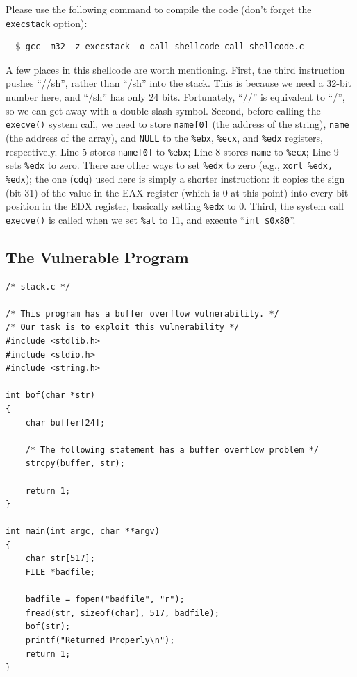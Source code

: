 Please use the following command to compile the code (don't forget the 
{\tt execstack} option):

\begin{verbatim}
  $ gcc -m32 -z execstack -o call_shellcode call_shellcode.c
\end{verbatim}


A few places in this shellcode are worth mentioning. First, 
the third instruction pushes ``//sh'', rather than ``/sh'' into the 
stack. This is because we need a 32-bit number here, and ``/sh'' 
has only 24 bits. Fortunately, ``//'' is equivalent to ``/'', so we can get 
away with a double slash symbol. Second, before calling the {\tt execve()}
system call, we need to store {\tt name[0]} (the address of the string), 
{\tt name} (the address of the array), and {\tt NULL} to
the {\tt \%ebx}, {\tt \%ecx}, and {\tt \%edx} registers, respectively. 
Line 5 stores {\tt name[0]} to {\tt \%ebx}; 
Line 8 stores {\tt name} to    {\tt \%ecx}; 
Line 9 sets {\tt \%edx} to zero. There are other ways to set {\tt \%edx}
to zero (e.g., {\tt xorl \%edx, \%edx}); the one ({\tt cdq}) used here
is simply a shorter instruction: it copies the sign (bit 31) of the value in the EAX
register (which is 0 at this point) into every bit position in the EDX
register, basically setting {\tt \%edx} to 0.
Third, the system call {\tt execve()} is called when we set {\tt \%al} to
11, and execute ``{\tt int \$0x80}''.

\subsection{The Vulnerable Program}

\begin{verbatim}
/* stack.c */

/* This program has a buffer overflow vulnerability. */
/* Our task is to exploit this vulnerability */
#include <stdlib.h>
#include <stdio.h>
#include <string.h>

int bof(char *str)
{
    char buffer[24];

    /* The following statement has a buffer overflow problem */ 
    strcpy(buffer, str);

    return 1;
}

int main(int argc, char **argv)
{
    char str[517];
    FILE *badfile;

    badfile = fopen("badfile", "r");
    fread(str, sizeof(char), 517, badfile);
    bof(str);
    printf("Returned Properly\n");
    return 1;
}
\end{verbatim}

